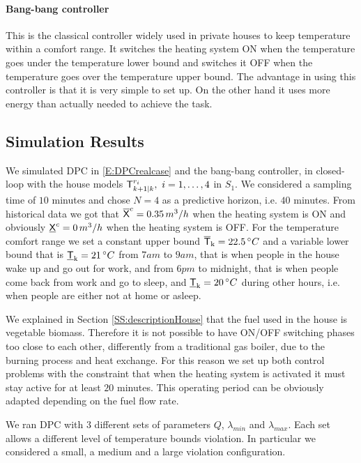 \paragraph{Bang-bang controller}
This is the classical controller widely used in private houses to keep temperature within a comfort range. It switches the heating system ON when the temperature goes under the temperature lower bound and switches it OFF when the temperature goes over the temperature upper bound. The advantage in using this controller is that it is very simple to set up. On the other hand it uses more energy than actually needed to achieve the task.

\subsection{Simulation Results}\label{SS:simulationResults} We simulated  DPC in \eqref{E:DPCrealcase} and the bang-bang controller, in closed-loop with the house models $\mathsf{T}^{r_i}_{k+1|k},\ i=1,\ldots,4$ in $S_1$. We considered a sampling time of $10$ minutes and chose $N=4$ as a predictive horizon, i.e. $40$ minutes. From historical data we got that $\overline{\mathsf{X}}^c = 0.35 \, m^3/h$ when the heating system is ON and obviously $\underline{\mathsf{X}}^c = 0 \, m^3/h$ when the heating system is OFF. For the temperature comfort range we set a constant upper bound $\overline{\mathsf{T}}_{\mathrm{k}} = 22.5 \, \degree C$ and a variable lower bound that is $\underline{\mathsf{T}}_{\mathrm{k}} = 21 \, \degree C$ from $7am$ to $9am$, that is when people in the house wake up and go out for work, and from $6pm$ to midnight, that is when people come back from work and go to sleep, and $\underline{\mathsf{T}}_{\mathrm{k}} = 20 \, \degree C$ during other hours, i.e. when people are either not at home or asleep.

We explained in Section \ref{SS:descriptionHouse} that the fuel used in the house is vegetable biomass. Therefore it is not possible to have ON/OFF switching phases too close to each other, differently from a traditional gas boiler, due to the burning process and heat exchange. For this reason we set up both control problems with the constraint that when the heating system is activated it must stay active for at least $20$ minutes. This operating period can be obviously adapted depending on the fuel flow rate.

We ran DPC with $3$ different sets of parameters $Q$, $\lambda_{min}$ and $\lambda_{max}$. Each set allows a different level of temperature bounds violation. In particular we considered a small, a medium and a large violation configuration.
